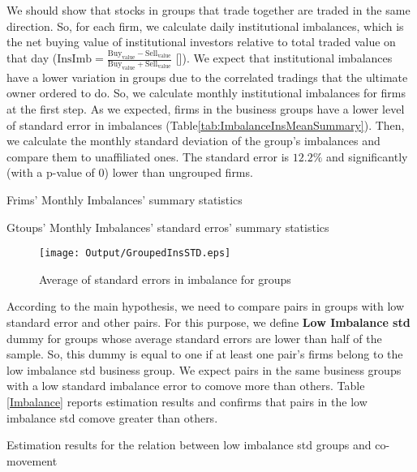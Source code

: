 	We should show that stocks in groups that trade together are traded in the same direction. So, for each firm, we calculate daily institutional imbalances, which is the net buying value of institutional investors relative to total traded value on that day ($ \text{InsImb} = \frac{\text{Buy}_{\text{value}} - \text{Sell}_{\text{value}}}{\text{Buy}_{\text{value}} + \text{Sell}_{\text{value}}} $ [\cite{seasholes2007predictable}]).
		We expect that institutional imbalances have a lower variation in groups due to the correlated tradings that the ultimate owner ordered to do. So, we calculate monthly institutional imbalances for firms at the first step. As we expected, firms in the business groups have a lower level of standard error in  imbalances (Table\ref{tab:ImbalanceInsMeanSummary}). Then, we calculate the monthly standard deviation of the group's imbalances and compare them to unaffiliated ones. The standard error is  $12.2\%$ and significantly (with a p-value of 0) lower than ungrouped firms. 
		
	{\begin{table}[htbp]
		\centering
		\caption{Frims' Monthly Imbalances' summary statistics}
		\resizebox{0.75\textwidth}{!}{
			
		}
		\label{tab:ImbalanceInsMeanSummary}%
	\end{table}}
	{\begin{table}[htbp]
		\centering
		\caption{Gtoups' Monthly Imbalances' standard erros' summary statistics}
		\resizebox{0.75\textwidth}{!}{
			
		}
		\label{tab:ImbalanceInsStdSummary}%
\end{table}}
	\begin{figure}[htbp]
		\centering
		\texttt{[image: Output/GroupedInsSTD.eps]}
				\caption{Average of standard errors in imbalance for groups}
		\label{fig:GroupedInsSTD}
	\end{figure}
	
	According to the main hypothesis, we need to compare pairs in groups with low standard error and other pairs. For this purpose, we define \textbf{Low Imbalance std} dummy for groups whose average standard errors are lower than half of the sample. So, this dummy is equal to one if at least one pair's firms belong to the low imbalance std business group. We expect pairs in the same business groups with a low standard imbalance error to comove more than others. Table \ref{Imbalance} reports estimation results and confirms that pairs in the low imbalance std comove greater than others. 
	
		{\begin{table}[htbp]
			\centering
			\caption{Estimation results for the relation between low imbalance std groups and co-movement}
			\label{Imbalance}
			\resizebox{\textwidth}{!}{
				
			}
	\end{table}}



\FloatBarrier

